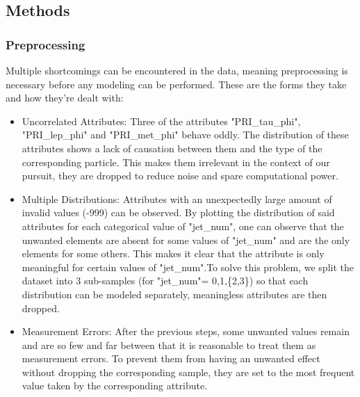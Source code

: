 \documentclass[10pt,conference,compsocconf]{IEEEtran}
\begin{document}
\subsection{Methods}
\subsubsection{Preprocessing}
Multiple shortcomings can be encountered  in the data, meaning preprocessing is necessary before any modeling can be performed.
These are the forms they take and how they're dealt with:
\begin{itemize}
\item Uncorrelated Attributes: Three of the attributes "PRI\_tau\_phi", "PRI\_lep\_phi" and "PRI\_met\_phi" behave oddly.
  The distribution of these attributes shows a lack of causation between them and the type of the corresponding particle. This makes them irrelevant in the context of our pursuit, they are dropped to reduce noise and spare computational power.
\item Multiple Distributions: Attributes with an unexpectedly large amount of invalid values (-999) can be observed. By plotting the distribution of said attributes for each categorical value of "jet\_num", one can observe that the unwanted elements are absent for some values of "jet\_num" and are the only elements for some others. This makes it clear that the attribute is only meaningful for certain values of "jet\_num".To solve this problem, we split the dataset into 3 sub-samples (for "jet\_num"= 0,1,\{2,3\}) so that each distribution can be modeled separately, meaningless attributes are then dropped.
\item Measurement Errors: After the previous steps, some unwanted values remain and are so few and far between that it is reasonable to treat them as measurement errors. To prevent them from having an unwanted effect without dropping the corresponding sample, they are set to the most frequent value taken by the corresponding attribute.
\end{itemize}
\end{document}
